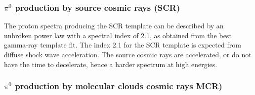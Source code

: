 %

\subsubsection{$\pi^0$ production by source cosmic rays (SCR)}

The proton spectra producing the SCR template can be described by an unbroken power law with a spectral index of 2.1, as obtained from the best gamma-ray template fit. The index 2.1 for the SCR template %
is expected from diffuse shock wave acceleration. %
The source cosmic rays are accelerated, or do not have the time to decelerate, hence a harder spectrum at high energies.


\subsubsection{$\pi^0$ production by molecular clouds cosmic rays MCR)}

